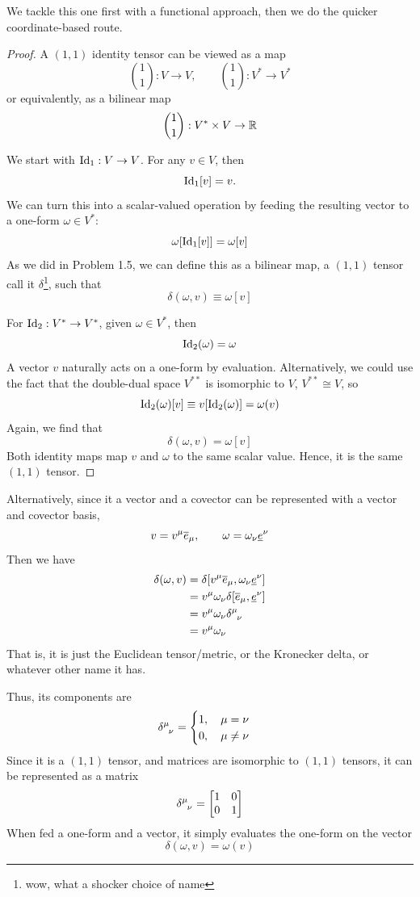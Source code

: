 	\begin{solution_pset}
			We tackle this one first with a functional approach,
			then we do the quicker coordinate-based route.
		\begin{proof}

			A $(1,1)$ identity tensor can be viewed as a map
			\[
				\binom{1}{1}:
				V\to V,\qquad 
				\binom{1}{1}:
				V^* \to V^*
			\]
			or equivalently, as a bilinear map
			\[
				\binom{1}{1}:
				V^*\times V\to \mathbb{R}
			\]

			We start with $\operatorname{Id}_1:V\to V$. 
			For any $v\in V$, then
			\[
				\operatorname{Id}_1[v]= v.
			\]
			We can turn this into a scalar-valued operation
			by feeding the resulting vector to a one-form $\omega\in V^*$:
			\[
				\omega[\operatorname{Id}_1[v]] = \omega[v]
			\]
			As we did in Problem 1.5, we can define this as a bilinear map, a $(1,1)$ tensor
			call it $\delta$\footnote{wow, what a shocker choice of name}, such that
			\[
				\delta(\omega,v) \equiv \omega[v]
			\]

			For $\operatorname{Id}_2:V^*\to V^*$, given $\omega\in V^*$,
			then
			\[
				\operatorname{Id}_2(\omega)= \omega
			\]
			A vector $v$ naturally acts on a one-form by evaluation.
			Alternatively, we could use the fact that the double-dual
			space $V^{**}$ is isomorphic to $V$, $V^{**}\cong V$, so 
			\[
				\operatorname{Id}_2(\omega)[v] \equiv v[\operatorname{Id}_2(\omega)] = \omega(v)
			\]
			Again, we find that
			\[
				\delta(\omega,v)= \omega[v]
			\]
			Both identity maps map $v$ and $\omega$ to the same 
			scalar value. Hence, it is the same $(1,1)$ tensor.
		\end{proof}

		Alternatively, since it a vector and a covector can be represented
		with a vector and covector basis,
		\[
			v = v^\mu \overline{e}_\mu,\qquad  \omega = \omega_\nu \underline{e}^\nu
		\]
		Then we have
		\begin{align*}
			\delta(\omega,v) 
			&= 
			\delta[
				v^\mu \ovr e_\mu,
				\omega_\nu \und e^\nu
			]\\
			&=
			v^\mu \omega_\nu \delta[\ovr e_\mu, \und e^\nu]\\
			&=
			v^\mu \omega_\nu \delta\indices{^\mu_\nu}\\
			&=
			v^\mu \omega_\nu
		\end{align*}
		That is, it is just the Euclidean tensor/metric,
		or the Kronecker delta, or whatever other name it has.

		Thus, its components are 
		\[
			\delta\indices{^\mu_\nu} = 
			\begin{cases}
			    1,\quad\mu=\nu\\
				0,\quad\mu\neq\nu
			\end{cases}
		\]
		Since it is a $(1,1)$ tensor, and matrices are isomorphic to $(1,1)$ tensors,
		it can be represented as a matrix
		\[
			\delta\indices{^\mu_\nu}
			=
			\bmqty{
				1 & 0 \\
				0 & 1
			} 
		\]
		When fed a one-form and a vector, it simply evaluates the
		one-form on the vector
		\[
			\delta(\omega,v) = \omega(v)
		\]


\end{solution_pset}
